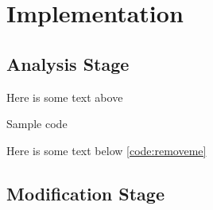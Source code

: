 \chapter{Implementation}
\section{Analysis Stage}

Here is some text above

\begin{code}
\caption{Sample code}
\label{code:removeme}
\end{code}

Here is some text below \autoref{code:removeme}

\section{Modification Stage}
